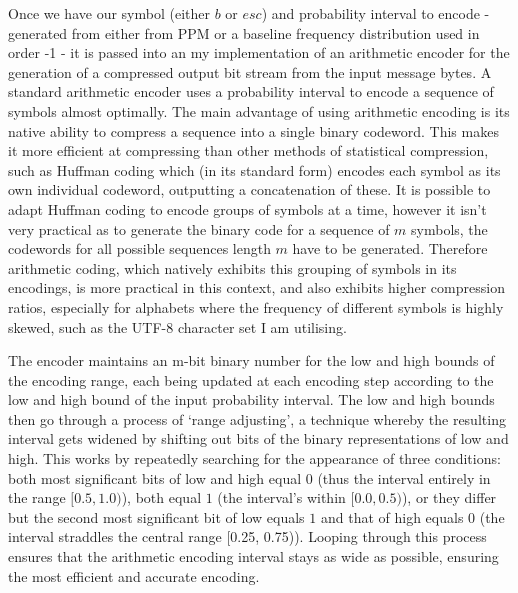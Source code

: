 \documentclass[a4paper, 11pt]{article}
\begin{document}
Once we have our symbol (either $b$ or $esc$) and probability interval to encode - generated from either from PPM or a baseline frequency distribution used in order -1 - it is passed into an my implementation of an arithmetic encoder for the generation of a compressed output bit stream from the input message bytes. A standard arithmetic encoder uses a probability interval to encode a sequence of symbols almost optimally. The main advantage of using arithmetic encoding is its native ability to compress a sequence into a single binary codeword. This makes it more efficient at compressing than other methods of statistical compression, such as Huffman coding which (in its standard form) encodes each symbol as its own individual codeword, outputting a concatenation of these. It is possible to adapt Huffman coding to encode groups of symbols at a time, however it isn't very practical as to generate the binary code for a sequence of $m$ symbols, the codewords for all possible sequences length $m$ have to be generated. Therefore arithmetic coding, which natively exhibits this grouping of symbols in its encodings, is more practical in this context, and also exhibits higher compression ratios, especially for alphabets where the frequency of different symbols is highly skewed, such as the UTF-8 character set I am utilising.

The encoder maintains an m-bit binary number for the low and high bounds of the encoding range, each being updated at each encoding step according to the low and high bound of the input probability interval. The low and high bounds then go through a process of ‘range adjusting’, a technique whereby the resulting interval gets widened by shifting out bits of the binary representations of low and high. This works by repeatedly searching for the appearance of three conditions: both most significant bits of low and high equal $0$ (thus the interval entirely in the range $[0.5, 1.0)$), both equal $1$ (the interval’s within $[0.0, 0.5)$), or they differ but the second most significant bit of low equals $1$ and that of high equals $0$ (the interval straddles the central range [0.25, 0.75)). Looping through this process ensures that the arithmetic encoding interval stays as wide as possible, ensuring the most efficient and accurate encoding.
\end{document}
